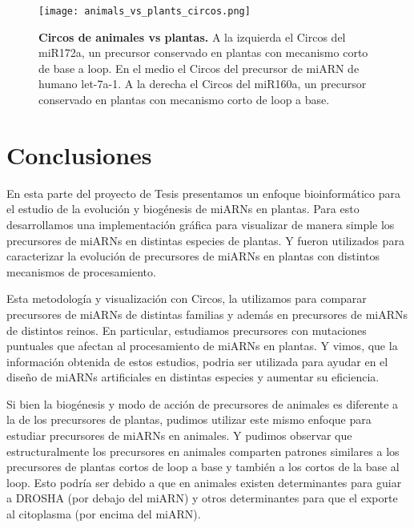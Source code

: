 \begin{landscape} 
\begin{figure}[htbp!] 
        \centering    
        \texttt{[image: animals\_vs\_plants\_circos.png]}
        \caption[Circos de animales vs plantas]{
        \textbf{Circos de animales vs plantas.}
		A la izquierda el Circos del miR172a, un precursor conservado en plantas con mecanismo corto de base a loop.
		En el medio el Circos del precursor de miARN de humano let-7a-1.
		A la derecha el Circos del miR160a, un precursor conservado en plantas con mecanismo corto de loop a base.
        }
	 \label{fig:animals_vs_plants_circos}
    \end{figure}
\end{landscape}


\section{Conclusiones}
En esta parte del proyecto de Tesis presentamos un enfoque bioinformático para el estudio de la evolución y biogénesis de miARNs en plantas.
Para esto desarrollamos una implementación gráfica para visualizar de manera simple los precursores de miARNs en distintas especies de plantas.
Y fueron utilizados para caracterizar la evolución de precursores de miARNs en plantas con distintos mecanismos de procesamiento.

Esta metodología y visualización con Circos, la utilizamos para comparar precursores de miARNs de distintas familias y además en precursores de miARNs de distintos reinos.
En particular, estudiamos precursores con mutaciones puntuales que afectan al procesamiento de miARNs en plantas.
Y vimos, que la información obtenida de estos estudios, podria ser utilizada para ayudar en el diseño de miARNs artificiales en distintas especies y aumentar su eficiencia.

Si bien la biogénesis y modo de acción de precursores de animales es diferente a la de los precursores de plantas, pudimos utilizar este mismo enfoque para estudiar precursores de miARNs en animales.
Y pudimos observar que estructuralmente los precursores en animales comparten patrones similares a los precursores de plantas cortos de loop a base y también a los cortos de la base al loop.
Esto podría ser debido a que en animales existen determinantes para guiar a DROSHA (por debajo del miARN) y otros determinantes para que el exporte al citoplasma (por encima del miARN).
